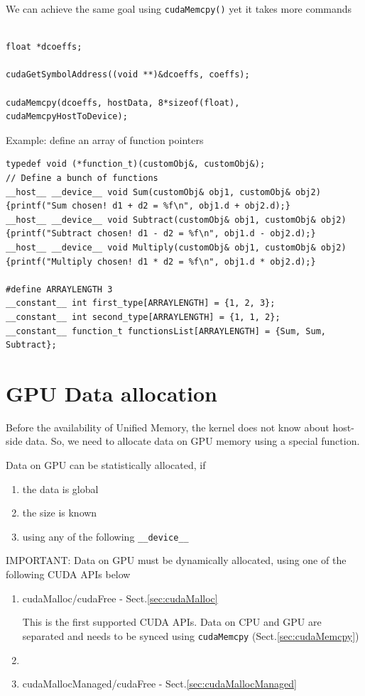 We can achieve the same goal using \verb!cudaMemcpy()! yet it takes more commands
\begin{lstlisting}

float *dcoeffs;

cudaGetSymbolAddress((void **)&dcoeffs, coeffs);

cudaMemcpy(dcoeffs, hostData, 8*sizeof(float), cudaMemcpyHostToDevice);
\end{lstlisting}

Example: define an array of function pointers 
\label{sec:array-function-pointer-CUDA-constant}
\begin{lstlisting}
typedef void (*function_t)(customObj&, customObj&);
// Define a bunch of functions
__host__ __device__ void Sum(customObj& obj1, customObj& obj2) {printf("Sum chosen! d1 + d2 = %f\n", obj1.d + obj2.d);}
__host__ __device__ void Subtract(customObj& obj1, customObj& obj2) {printf("Subtract chosen! d1 - d2 = %f\n", obj1.d - obj2.d);}
__host__ __device__ void Multiply(customObj& obj1, customObj& obj2) {printf("Multiply chosen! d1 * d2 = %f\n", obj1.d * obj2.d);}

#define ARRAYLENGTH 3
__constant__ int first_type[ARRAYLENGTH] = {1, 2, 3};
__constant__ int second_type[ARRAYLENGTH] = {1, 1, 2};
__constant__ function_t functionsList[ARRAYLENGTH] = {Sum, Sum, Subtract};
\end{lstlisting}



\section{GPU Data allocation}
\label{sec:cudac_data_malloc}
\label{sec:cudac_variables}

Before the availability of Unified Memory, the kernel does not know about host-side data. So,
we need to allocate data on GPU memory using a special function.


Data on GPU can be statistically allocated, if
\begin{enumerate}
  \item the data is global
  
  
  \item the size is known
  
  
  \item using any of the following \verb!__device__!
  

\end{enumerate}

IMPORTANT: Data on GPU must be dynamically allocated, using one of the following CUDA APIs below
\begin{enumerate}
  \item cudaMalloc/cudaFree - Sect.\ref{sec:cudaMalloc}
  
  This is the first supported CUDA APIs. 
  Data on CPU and GPU are separated and needs to be synced using \verb!cudaMemcpy! (Sect.\ref{sec:cudaMemcpy})
  
  \item 
  \item cudaMallocManaged/cudaFree - Sect.\ref{sec:cudaMallocManaged}
\end{enumerate}

